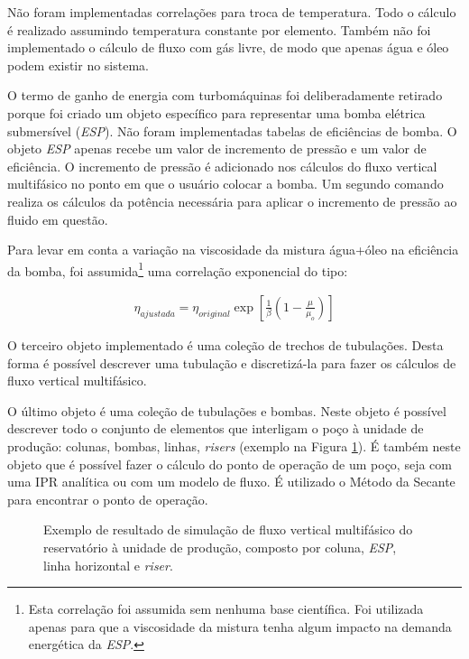 \documentclass[final,5p]{elsarticle}
\numberwithin{equation}{section}
\begin{document}
        Não foram implementadas correlações para troca de temperatura. Todo o cálculo é realizado assumindo temperatura constante por elemento. Também não foi implementado o cálculo de fluxo com gás livre, de modo que apenas água e óleo podem existir no sistema.

        O termo de ganho de energia com turbomáquinas foi deliberadamente retirado porque foi criado um objeto específico para representar uma bomba elétrica submersível (\emph{ESP}). Não foram implementadas tabelas de eficiências de bomba. O objeto \emph{ESP} apenas recebe um valor de incremento de pressão e um valor de eficiência. O incremento de pressão é adicionado nos cálculos do fluxo vertical multifásico no ponto em que o usuário colocar a bomba. Um segundo comando realiza os cálculos da potência necessária para aplicar o incremento de pressão ao fluido em questão.

        Para levar em conta a variação na viscosidade da mistura água+óleo na eficiência da bomba, foi assumida\footnote{Esta correlação foi assumida sem nenhuma base científica. Foi utilizada apenas para que a viscosidade da mistura tenha algum impacto na demanda energética da \emph{ESP}.} uma correlação exponencial do tipo:

        \begin{align}
            \eta_{ajustada} = \eta_{original} \exp \left[\frac{1}{\beta}\left(1-\frac{\mu}{\mu_o}\right) \right]
        \end{align}

        O terceiro objeto implementado é uma coleção de trechos de tubulações. Desta forma é possível descrever uma tubulação e discretizá-la para fazer os cálculos de fluxo vertical multifásico.

        O último objeto é uma coleção de tubulações e bombas. Neste objeto é possível descrever todo o conjunto de elementos que interligam o poço à unidade de produção: colunas, bombas, linhas, \emph{risers} (exemplo na Figura \ref{fig:flow}). É também neste objeto que é possível fazer o cálculo do ponto de operação de um poço, seja com uma IPR analítica ou com um modelo de fluxo. É utilizado o Método da Secante para encontrar o ponto de operação.

        \begin{figure}[hbt!]
            \caption{Exemplo de resultado de simulação de fluxo vertical multifásico do reservatório à unidade de produção, composto por coluna, \emph{ESP}, linha horizontal e \emph{riser}.}
            \label{fig:flow}
        \end{figure}
\end{document}
